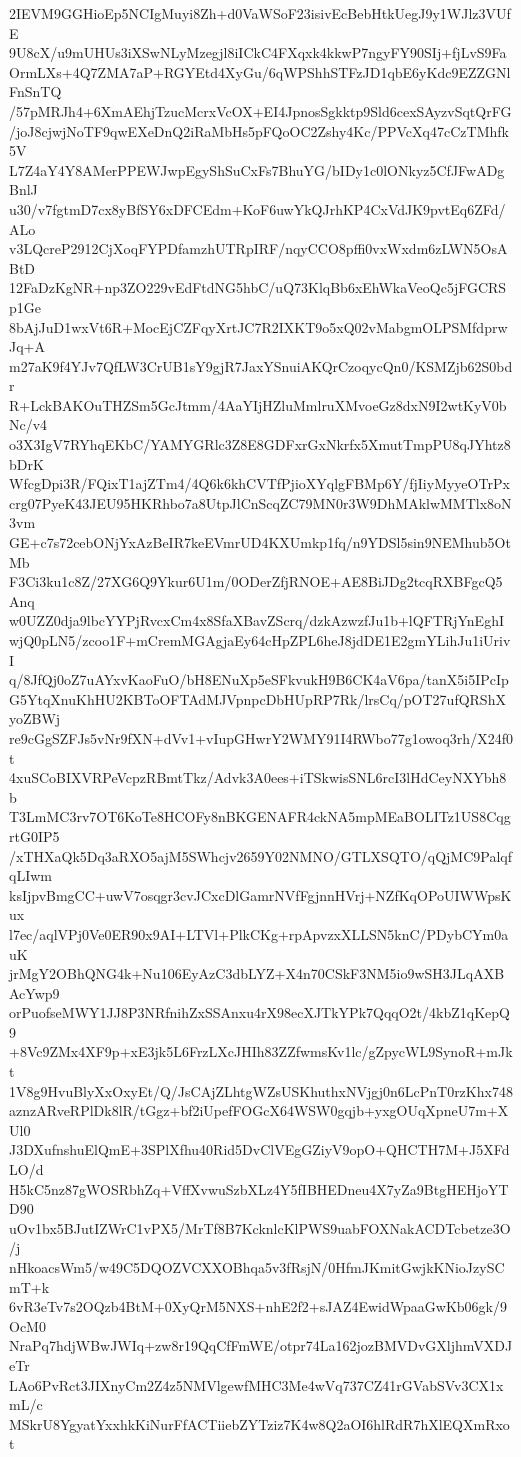 2IEVM9GGHioEp5NCIgMuyi8Zh+d0VaWSoF23isivEcBebHtkUegJ9y1WJlz3VUfE
9U8cX/u9mUHUs3iXSwNLyMzegjl8iICkC4FXqxk4kkwP7ngyFY90SIj+fjLvS9Fa
OrmLXs+4Q7ZMA7aP+RGYEtd4XyGu/6qWPShhSTFzJD1qbE6yKdc9EZZGNlFnSnTQ
/57pMRJh4+6XmAEhjTzucMcrxVcOX+EI4JpnosSgkktp9Sld6cexSAyzvSqtQrFG
/joJ8cjwjNoTF9qwEXeDnQ2iRaMbHs5pFQoOC2Zshy4Kc/PPVcXq47cCzTMhfk5V
L7Z4aY4Y8AMerPPEWJwpEgyShSuCxFs7BhuYG/bIDy1c0lONkyz5CfJFwADgBnlJ
u30/v7fgtmD7cx8yBfSY6xDFCEdm+KoF6uwYkQJrhKP4CxVdJK9pvtEq6ZFd/ALo
v3LQcreP2912CjXoqFYPDfamzhUTRpIRF/nqyCCO8pffi0vxWxdm6zLWN5OsABtD
12FaDzKgNR+np3ZO229vEdFtdNG5hbC/uQ73KlqBb6xEhWkaVeoQc5jFGCRSp1Ge
8bAjJuD1wxVt6R+MocEjCZFqyXrtJC7R2IXKT9o5xQ02vMabgmOLPSMfdprwJq+A
m27aK9f4YJv7QfLW3CrUB1sY9gjR7JaxYSnuiAKQrCzoqycQn0/KSMZjb62S0bdr
R+LckBAKOuTHZSm5GcJtmm/4AaYIjHZluMmlruXMvoeGz8dxN9I2wtKyV0bNc/v4
o3X3IgV7RYhqEKbC/YAMYGRlc3Z8E8GDFxrGxNkrfx5XmutTmpPU8qJYhtz8bDrK
WfcgDpi3R/FQixT1ajZTm4/4Q6k6khCVTfPjioXYqlgFBMp6Y/fjIiyMyyeOTrPx
crg07PyeK43JEU95HKRhbo7a8UtpJlCnScqZC79MN0r3W9DhMAklwMMTlx8oN3vm
GE+c7s72cebONjYxAzBeIR7keEVmrUD4KXUmkp1fq/n9YDSl5sin9NEMhub5OtMb
F3Ci3ku1c8Z/27XG6Q9Ykur6U1m/0ODerZfjRNOE+AE8BiJDg2tcqRXBFgcQ5Anq
w0UZZ0dja9lbcYYPjRvcxCm4x8SfaXBavZScrq/dzkAzwzfJu1b+lQFTRjYnEghI
wjQ0pLN5/zcoo1F+mCremMGAgjaEy64cHpZPL6heJ8jdDE1E2gmYLihJu1iUrivI
q/8JfQj0oZ7uAYxvKaoFuO/bH8ENuXp5eSFkvukH9B6CK4aV6pa/tanX5i5IPcIp
G5YtqXnuKhHU2KBToOFTAdMJVpnpcDbHUpRP7Rk/lrsCq/pOT27ufQRShXyoZBWj
re9cGgSZFJs5vNr9fXN+dVv1+vIupGHwrY2WMY91I4RWbo77g1owoq3rh/X24f0t
4xuSCoBIXVRPeVcpzRBmtTkz/Advk3A0ees+iTSkwisSNL6rcI3lHdCeyNXYbh8b
T3LmMC3rv7OT6KoTe8HCOFy8nBKGENAFR4ckNA5mpMEaBOLITz1US8CqgrtG0IP5
/xTHXaQk5Dq3aRXO5ajM5SWhcjv2659Y02NMNO/GTLXSQTO/qQjMC9PalqfqLIwm
ksIjpvBmgCC+uwV7osqgr3cvJCxcDlGamrNVfFgjnnHVrj+NZfKqOPoUIWWpsKux
l7ec/aqlVPj0Ve0ER90x9AI+LTVl+PlkCKg+rpApvzxXLLSN5knC/PDybCYm0auK
jrMgY2OBhQNG4k+Nu106EyAzC3dbLYZ+X4n70CSkF3NM5io9wSH3JLqAXBAcYwp9
orPuofseMWY1JJ8P3NRfnihZxSSAnxu4rX98ecXJTkYPk7QqqO2t/4kbZ1qKepQ9
+8Vc9ZMx4XF9p+xE3jk5L6FrzLXcJHIh83ZZfwmsKv1lc/gZpycWL9SynoR+mJkt
1V8g9HvuBlyXxOxyEt/Q/JsCAjZLhtgWZsUSKhuthxNVjgj0n6LcPnT0rzKhx748
aznzARveRPlDk8lR/tGgz+bf2iUpefFOGcX64WSW0gqjb+yxgOUqXpneU7m+XUl0
J3DXufnshuElQmE+3SPlXfhu40Rid5DvClVEgGZiyV9opO+QHCTH7M+J5XFdLO/d
H5kC5nz87gWOSRbhZq+VffXvwuSzbXLz4Y5fIBHEDneu4X7yZa9BtgHEHjoYTD90
uOv1bx5BJutIZWrC1vPX5/MrTf8B7KcknlcKlPWS9uabFOXNakACDTcbetze3O/j
nHkoacsWm5/w49C5DQOZVCXXOBhqa5v3fRsjN/0HfmJKmitGwjkKNioJzySCmT+k
6vR3eTv7s2OQzb4BtM+0XyQrM5NXS+nhE2f2+sJAZ4EwidWpaaGwKb06gk/9OcM0
NraPq7hdjWBwJWIq+zw8r19QqCfFmWE/otpr74La162jozBMVDvGXljhmVXDJeTr
LAo6PvRct3JIXnyCm2Z4z5NMVlgewfMHC3Me4wVq737CZ41rGVabSVv3CX1xmL/c
MSkrU8YgyatYxxhkKiNurFfACTiiebZYTziz7K4w8Q2aOI6hlRdR7hXlEQXmRxot
